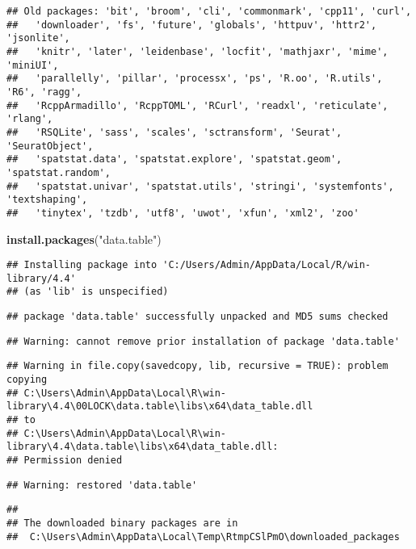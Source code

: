 \documentclass[
]{article}
\newenvironment{Shaded}{\begin{snugshade}}{\end{snugshade}}
\newcommand{\FunctionTok}[1]{\textcolor[rgb]{0.13,0.29,0.53}{\textbf{#1}}}
\newcommand{\NormalTok}[1]{#1}
\newcommand{\StringTok}[1]{\textcolor[rgb]{0.31,0.60,0.02}{#1}}
\begin{document}
\begin{verbatim}
## Old packages: 'bit', 'broom', 'cli', 'commonmark', 'cpp11', 'curl',
##   'downloader', 'fs', 'future', 'globals', 'httpuv', 'httr2', 'jsonlite',
##   'knitr', 'later', 'leidenbase', 'locfit', 'mathjaxr', 'mime', 'miniUI',
##   'parallelly', 'pillar', 'processx', 'ps', 'R.oo', 'R.utils', 'R6', 'ragg',
##   'RcppArmadillo', 'RcppTOML', 'RCurl', 'readxl', 'reticulate', 'rlang',
##   'RSQLite', 'sass', 'scales', 'sctransform', 'Seurat', 'SeuratObject',
##   'spatstat.data', 'spatstat.explore', 'spatstat.geom', 'spatstat.random',
##   'spatstat.univar', 'spatstat.utils', 'stringi', 'systemfonts', 'textshaping',
##   'tinytex', 'tzdb', 'utf8', 'uwot', 'xfun', 'xml2', 'zoo'
\end{verbatim}

\begin{Shaded}
\begin{Highlighting}[]
\FunctionTok{install.packages}\NormalTok{(}\StringTok{"data.table"}\NormalTok{)}
\end{Highlighting}
\end{Shaded}

\begin{verbatim}
## Installing package into 'C:/Users/Admin/AppData/Local/R/win-library/4.4'
## (as 'lib' is unspecified)
\end{verbatim}

\begin{verbatim}
## package 'data.table' successfully unpacked and MD5 sums checked
\end{verbatim}

\begin{verbatim}
## Warning: cannot remove prior installation of package 'data.table'
\end{verbatim}

\begin{verbatim}
## Warning in file.copy(savedcopy, lib, recursive = TRUE): problem copying
## C:\Users\Admin\AppData\Local\R\win-library\4.4\00LOCK\data.table\libs\x64\data_table.dll
## to
## C:\Users\Admin\AppData\Local\R\win-library\4.4\data.table\libs\x64\data_table.dll:
## Permission denied
\end{verbatim}

\begin{verbatim}
## Warning: restored 'data.table'
\end{verbatim}

\begin{verbatim}
## 
## The downloaded binary packages are in
##  C:\Users\Admin\AppData\Local\Temp\RtmpCSlPmO\downloaded_packages
\end{verbatim}
\end{document}

